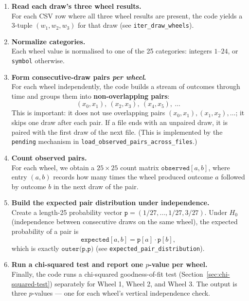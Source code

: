 \begin{enumerate}
  \item \textbf{Read each draw's three wheel results.}\\
        For each CSV row where all three wheel results are present, the code
        yields a 3-tuple \((w_1,w_2,w_3)\) for that draw (see
        \texttt{iter\_draw\_wheels}).

  \item \textbf{Normalize categories.}\\
        Each wheel value is normalised to one of the 25 categories:
        integers \(1\)--\(24\), or \texttt{symbol} otherwise.

  \item \textbf{Form consecutive-draw pairs \emph{per wheel}.}\\
        For each wheel independently, the code builds a stream of outcomes
        through time and groups them into \textbf{non-overlapping pairs}:
        \[
          (x_0,x_1),\ (x_2,x_3),\ (x_4,x_5),\ \dots
        \]
        This is important: it does not use overlapping pairs \((x_0,x_1),
        (x_1,x_2), \dots\); it skips one draw after each pair.  If a file ends
        with an unpaired draw, it is paired with the first draw of the next
        file.  (This is implemented by the \texttt{pending} mechanism in
        \texttt{load\_observed\_pairs\_across\_files}.)

  \item \textbf{Count observed pairs.}\\
        For each wheel, we obtain a \(25\times 25\) count matrix
        \(\texttt{observed}[a,b]\), where entry \((a,b)\) records how many times
        the wheel produced outcome \(a\) followed by outcome \(b\) in the next
        draw of the pair.

  \item \textbf{Build the expected pair distribution under independence.}\\
        Create a length-25 probability vector
        \(\texttt{p} = (1/27,\dots,1/27,3/27)\).  Under $H_0$ (independence
        between consecutive draws on the same wheel), the expected probability
        of a pair is
        \[
          \texttt{expected}[a,b] = \texttt{p}[a]\cdot \texttt{p}[b],
        \]
        which is exactly \(\texttt{outer(p,p)}\) (see
        \texttt{expected\_pair\_distribution}).

  \item \textbf{Run a chi-squared test and report one $p$-value per wheel.}\\
        Finally, the code runs a chi-squared goodness-of-fit test
        (Section~\ref{sec:chi-squared-test}) separately for Wheel 1, Wheel 2,
        and Wheel 3.  The output is three $p$-values --- one for each wheel's
        vertical independence check.
\end{enumerate}

